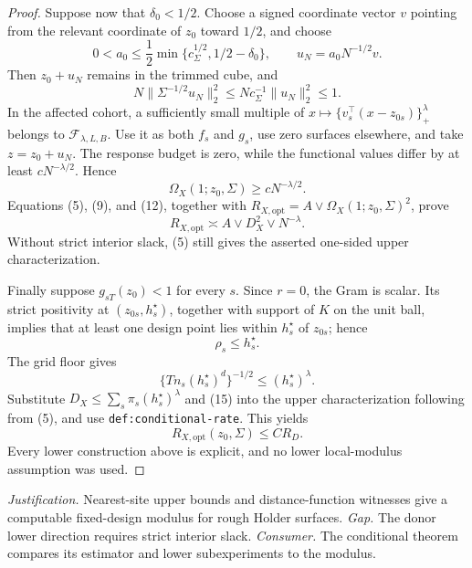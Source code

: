 \documentclass{article}
\begin{document}
\begin{proof}
Suppose now that \(\delta_0<1/2\).  Choose a signed coordinate vector \(v\) pointing from the relevant coordinate of \(z_0\) toward \(1/2\), and choose
\[
 0<a_0\le\frac12\min\{c_\Sigma^{1/2},1/2-\delta_0\},
 \qquad u_N=a_0N^{-1/2}v.                                  \tag{10}
\]
Then \(z_0+u_N\) remains in the trimmed cube, and
\[
 N\|\Sigma^{-1/2}u_N\|_2^2
 \le Nc_\Sigma^{-1}\|u_N\|_2^2\le1.                     \tag{11}
\]
In the affected cohort, a sufficiently small multiple of
\(x\mapsto\{v_s^\top(x-z_{0s})\}_+^\lambda\) belongs to
\(\mathcal F_{\lambda,L,B}\).  Use it as both \(f_s\) and \(g_s\), use zero surfaces elsewhere, and take \(z=z_0+u_N\).  The response budget is zero, while the functional values differ by at least \(cN^{-\lambda/2}\).  Hence
\[
 \Omega_X(1;z_0,\Sigma)\ge cN^{-\lambda/2}.                \tag{12}
\]
Equations (5), (9), and (12), together with
\(R_{X,\mathrm{opt}}=A\vee\Omega_X(1;z_0,\Sigma)^2\), prove
\[
 R_{X,\mathrm{opt}}\asymp A\vee D_X^2\vee N^{-\lambda}.   \tag{13}
\]
Without strict interior slack, (5) still gives the asserted one-sided upper characterization.

Finally suppose \(g_{sT}(z_0)<1\) for every \(s\).  Since \(r=0\), the Gram is scalar.  Its strict positivity at \((z_{0s},h_s^\star)\), together with support of \(K\) on the unit ball, implies that at least one design point lies within \(h_s^\star\) of \(z_{0s}\); hence
\[
 \rho_s\le h_s^\star.                                     \tag{14}
\]
The grid floor gives
\[
 \{Tn_s(h_s^\star)^d\}^{-1/2}
 \le(h_s^\star)^\lambda.                                  \tag{15}
\]
Substitute
\(D_X\le\sum_s\pi_s(h_s^\star)^\lambda\) and (15) into the upper characterization following from (5), and use \texttt{def:conditional-rate}.  This yields
\[
 R_{X,\mathrm{opt}}(z_0,\Sigma)\le CR_D.                   \tag{16}
\]
Every lower construction above is explicit, and no lower local-modulus assumption was used.
\end{proof}
\par\smallskip\noindent \textit{Justification.} Nearest-site upper bounds and distance-function witnesses give a computable fixed-design modulus for rough Holder surfaces. \textit{Gap.} The donor lower direction requires strict interior slack. \textit{Consumer.} The conditional theorem compares its estimator and lower subexperiments to the modulus.
\end{document}
